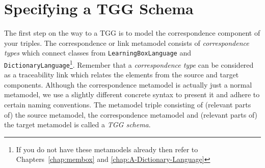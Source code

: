 \section{Specifying a TGG Schema}

The first step on the way to a TGG is to model the correspondence component of your triples.
The correspondence or link metamodel consists of \emph{correspondence types} which connect classes from \texttt{LearningBoxLanguage} and \texttt{DictionaryLanguage}\footnote{If you do not have these metamodels already then refer to Chapters~\ref{chap:membox} and \ref{chap:A-Dictionary-Language}}.
Remember that a \emph{correspondence type} can be considered as a traceability link which relates the elements from the source and target components.
Although the correspondence metamodel is actually just a normal metamodel, we use a slightly different concrete syntax to present it and adhere to certain naming conventions.
The metamodel triple consisting of (relevant parts of) the source metamodel, the correspondence metamodel and (relevant parts of) the target metamodel is called a \emph{TGG schema}. 


